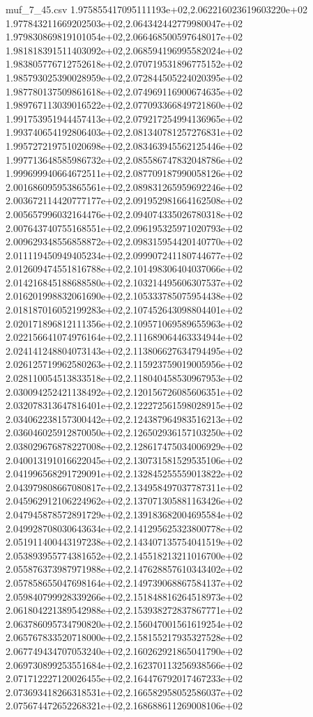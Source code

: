 \begin{filecontents*}{muf_7_45.csv}
1.975855417095111193e+02,2.062216023619603220e+02
1.977843211669202503e+02,2.064342442779980047e+02
1.979830869819101054e+02,2.066468500597648017e+02
1.981818391511403092e+02,2.068594196995582024e+02
1.983805776712752618e+02,2.070719531896775152e+02
1.985793025390028959e+02,2.072844505224020395e+02
1.987780137509861618e+02,2.074969116900674635e+02
1.989767113039016522e+02,2.077093366849721860e+02
1.991753951944457413e+02,2.079217254994136965e+02
1.993740654192806403e+02,2.081340781257276831e+02
1.995727219751020698e+02,2.083463945562125446e+02
1.997713648585986732e+02,2.085586747832048786e+02
1.999699940664672511e+02,2.087709187990058126e+02
2.001686095953865561e+02,2.089831265959692246e+02
2.003672114420777177e+02,2.091952981664162508e+02
2.005657996032164476e+02,2.094074335026780318e+02
2.007643740755168551e+02,2.096195325971020793e+02
2.009629348556858872e+02,2.098315954420140770e+02
2.011119450949405234e+02,2.099907241180744677e+02
2.012609474551816788e+02,2.101498306404037066e+02
2.014216845188688580e+02,2.103214495606307537e+02
2.016201998832061690e+02,2.105333785075954438e+02
2.018187016052199283e+02,2.107452643098804401e+02
2.020171896812111356e+02,2.109571069589655963e+02
2.022156641074976164e+02,2.111689064463334944e+02
2.024141248804073143e+02,2.113806627634794495e+02
2.026125719962580263e+02,2.115923759019005956e+02
2.028110054513833518e+02,2.118040458530967953e+02
2.030094252421138492e+02,2.120156726085606351e+02
2.032078313647816401e+02,2.122272561598028915e+02
2.034062238157300442e+02,2.124387964983516213e+02
2.036046025912870050e+02,2.126502936157103250e+02
2.038029676878227008e+02,2.128617475034006929e+02
2.040013191016622045e+02,2.130731581529535106e+02
2.041996568291729091e+02,2.132845255559013822e+02
2.043979808667080817e+02,2.134958497037787311e+02
2.045962912106224962e+02,2.137071305881163426e+02
2.047945878572891729e+02,2.139183682004695584e+02
2.049928708030643634e+02,2.141295625323800778e+02
2.051911400443197238e+02,2.143407135754041519e+02
2.053893955774381652e+02,2.145518213211016700e+02
2.055876373987971988e+02,2.147628857610343402e+02
2.057858655047698164e+02,2.149739068867584137e+02
2.059840799928339266e+02,2.151848816264518973e+02
2.061804221389542988e+02,2.153938272837867771e+02
2.063786095734790820e+02,2.156047001561619254e+02
2.065767833520718000e+02,2.158155217935327528e+02
2.067749434707053240e+02,2.160262921865041790e+02
2.069730899253551684e+02,2.162370113256938566e+02
2.071712227120026455e+02,2.164476792017467233e+02
2.073693418266318531e+02,2.166582958052586037e+02
2.075674472652268321e+02,2.168688611269008106e+02

\end{filecontents*}
